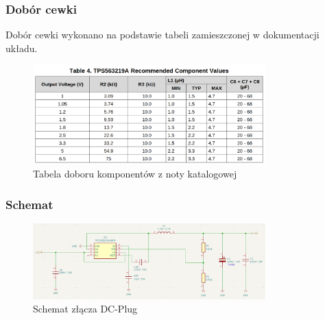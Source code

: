 \documentclass{article}
\begin{document}
\subsubsection{Dobór cewki}
Dobór cewki wykonano na podstawie tabeli zamieszczonej w dokumentacji układu.
\begin{figure}[H]
    \centering
    \includegraphics[width=0.8\textwidth]{conv-table.png}
    \caption{Tabela doboru komponentów z noty katalogowej}
\end{figure}



\subsubsection{Schemat}
\begin{figure}[H]
    \centering
    \includegraphics[width=0.8\textwidth]{12V_to_5V_conv_schemat.png}
    \caption{Schemat złącza DC-Plug}
\end{figure}
\end{document}
